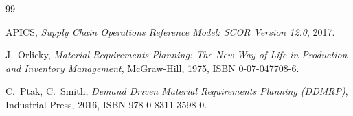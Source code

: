 
\begin{thebibliography}{99}

APICS, \textit{Supply Chain Operations Reference Model: SCOR Version 12.0}, 2017.

J.~Orlicky, \textit{Material Requirements Planning: The New Way of Life in Production and
Inventory Management}, McGraw-Hill, 1975, ISBN 0-07-047708-6.

C.~Ptak, C.~Smith, \textit{Demand Driven Material Requirements Planning (DDMRP)}, Industrial Press,
2016, ISBN 978-0-8311-3598-0.

\end{thebibliography}
